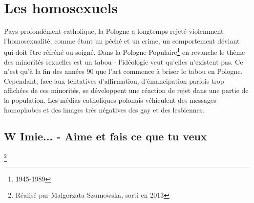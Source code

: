 \documentclass[12pt]{amsart}
\begin{document}
\section{Les homosexuels}
Pays profondément catholique, la Pologne a longtemps rejeté violemment l’homosexualité, comme étant un péché et un crime, un comportement déviant qui doit être réfréné ou soigné. Dans la Pologne Populaire\footnote{1945-1989} en revanche le thème des minorités sexuelles est un tabou - l'idéologie veut qu'elles n'existent pas. Ce n'est qu'à la fin des années 90 que l'art commence à briser le tabou en Pologne. Cependant, face aux tentatives d'affirmation, d'émancipation parfois trop affichées de ces minorités, se développent une réaction de rejet dans une partie de la population. Les médias catholiques polonais véhiculent des messages homophobes et des images très négatives des gay et des lesbiennes. 
\subsection*{W Imie... - Aime et fais ce que tu veux}\footnote{Réalisé par Malgorzata Szumowska, sorti en 2013}
\end{document}
